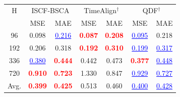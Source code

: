\begin{tabular}{c|cc|cc|cc}
\toprule
H & \multicolumn{2}{c}{ISCF-BSCA} & \multicolumn{2}{c}{TimeAlign$^{\dagger}$} & \multicolumn{2}{c}{QDF$^{\dagger}$} \\
 & MSE & MAE & MSE & MAE & MSE & MAE \\
\midrule
96 & 0.098 & \textcolor{blue}{\underline{0.216}} & \textcolor{red}{\textbf{0.087}} & \textcolor{red}{\textbf{0.208}} & \textcolor{blue}{\underline{0.095}} & 0.218 \\
192 & 0.206 & 0.318 & \textcolor{red}{\textbf{0.192}} & \textcolor{red}{\textbf{0.310}} & \textcolor{blue}{\underline{0.199}} & \textcolor{blue}{\underline{0.317}} \\
336 & \textcolor{blue}{\underline{0.380}} & \textcolor{red}{\textbf{0.444}} & 0.442 & 0.473 & \textcolor{red}{\textbf{0.377}} & \textcolor{blue}{\underline{0.448}} \\
720 & \textcolor{red}{\textbf{0.910}} & \textcolor{red}{\textbf{0.723}} & 1.330 & 0.847 & \textcolor{blue}{\underline{0.929}} & \textcolor{blue}{\underline{0.727}} \\
Avg. & \textcolor{red}{\textbf{0.399}} & \textcolor{red}{\textbf{0.425}} & 0.513 & 0.460 & \textcolor{blue}{\underline{0.400}} & \textcolor{blue}{\underline{0.428}} \\
\bottomrule
\end{tabular}
